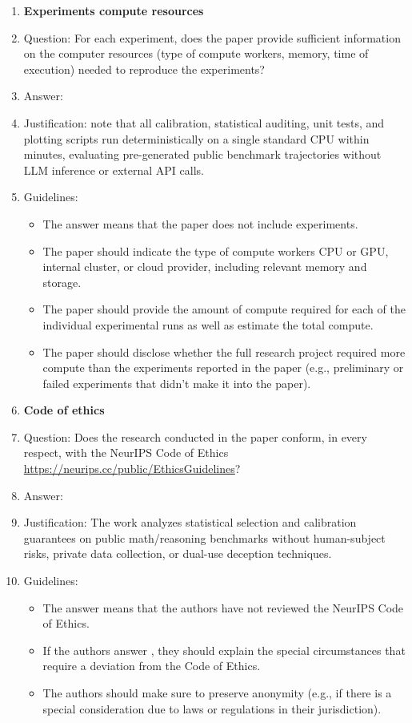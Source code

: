 \documentclass{article}
\theoremstyle{plain}
\theoremstyle{definition}
\theoremstyle{remark}
\begin{document}
\begin{enumerate}
\item {\bf Experiments compute resources}
    \item[] Question: For each experiment, does the paper provide sufficient information on the computer resources (type of compute workers, memory, time of execution) needed to reproduce the experiments?
    \item[] Answer: \answerYes{}
    \item[] Justification:  note that all calibration, statistical auditing, unit tests, and plotting scripts run deterministically on a single standard CPU within minutes, evaluating pre-generated public benchmark trajectories without LLM inference or external API calls.
    \item[] Guidelines:
    \begin{itemize}
        \item The answer \answerNA{} means that the paper does not include experiments.
        \item The paper should indicate the type of compute workers CPU or GPU, internal cluster, or cloud provider, including relevant memory and storage.
        \item The paper should provide the amount of compute required for each of the individual experimental runs as well as estimate the total compute.
        \item The paper should disclose whether the full research project required more compute than the experiments reported in the paper (e.g., preliminary or failed experiments that didn't make it into the paper).
    \end{itemize}

\item {\bf Code of ethics}
    \item[] Question: Does the research conducted in the paper conform, in every respect, with the NeurIPS Code of Ethics \url{https://neurips.cc/public/EthicsGuidelines}?
    \item[] Answer: \answerYes{}
    \item[] Justification: The work analyzes statistical selection and calibration guarantees on public math/reasoning benchmarks without human-subject risks, private data collection, or dual-use deception techniques.
    \item[] Guidelines:
    \begin{itemize}
        \item The answer \answerNA{} means that the authors have not reviewed the NeurIPS Code of Ethics.
        \item If the authors answer \answerNo{}, they should explain the special circumstances that require a deviation from the Code of Ethics.
        \item The authors should make sure to preserve anonymity (e.g., if there is a special consideration due to laws or regulations in their jurisdiction).
    \end{itemize}


\end{enumerate}
\end{document}
